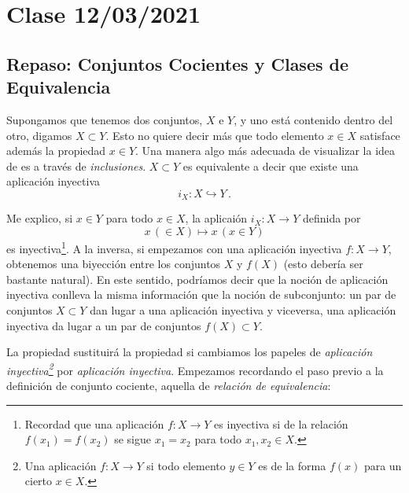 \documentclass[a4paper,11pt]{amsart}
\theoremstyle{plain}
\theoremstyle{definition}
\theoremstyle{remark}
\begin{document}
\section{Clase 12/03/2021}

\subsection{Repaso: Conjuntos Cocientes y Clases de Equivalencia}


Supongamos que tenemos dos conjuntos, $X$ e $Y$, y uno está contenido dentro del otro, digamos $X \subset Y$. Esto no quiere decir más que todo elemento $x \in X$ satisface además la propiedad $x \in Y$. Una manera algo más adecuada de visualizar la idea de  es a través de \textit{inclusiones}. $X \subset Y$ es equivalente a decir que existe una aplicación inyectiva 
$$i_X \colon X \hookrightarrow Y \, .$$

Me explico, si $x \in Y$ para todo $x \in X$, la aplicaión $i_X \colon X \to Y$ definida por 
$$x \, (\in X) \mapsto x \, (x \in Y)$$
es inyectiva\footnote{Recordad que una aplicación $f \colon X \to Y$ es inyectiva si de la relación $f(x_1) = f(x_2)$ se sigue $x_1 = x_2$ para todo $x_1, x_2 \in X$.}. A la inversa, si empezamos con una aplicación inyectiva $f \colon X \to Y$, obtenemos una biyección entre los conjuntos $X$ y $f(X)$ (esto debería ser bastante natural). En este sentido, podríamos decir que la noción de aplicación inyectiva conlleva la misma información que la noción de subconjunto: un par de conjuntos $X \subset Y$ dan lugar a una aplicación inyectiva y viceversa, una aplicación inyectiva da lugar a un par de conjuntos $f(X) \subset Y$. 


La propiedad  sustituirá la propiedad  si cambiamos los papeles de \textit{aplicación inyectiva\footnote{Una aplicación $f \colon X \to Y$ si todo elemento $y \in Y$ es de la forma $f(x)$ para un cierto $x \in X$.}} por \textit{aplicación inyectiva}. Empezamos recordando el paso previo a la definición de conjunto cociente, aquella de \textit{relación de equivalencia}:
\end{document}
